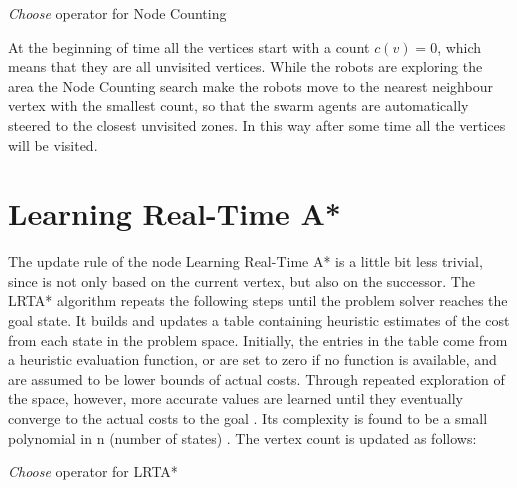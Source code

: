 \begin{algorithm}
\begin{algorithmic}[1]
 \label{a:find_next_nc}
\label{eq:nc_rule}
\end{algorithmic}
\caption{\emph{Choose} operator for Node Counting}\label{alg:rt_nc}
\end{algorithm}


At the beginning of time all the vertices start with a count $c(v)=0$, which means that they are all unvisited vertices. While the robots are exploring the area the Node Counting search make the robots move to the nearest neighbour vertex with the smallest count, so that the swarm agents are automatically steered to the closest unvisited zones. In this way after some time all the vertices will be visited.

\section{Learning Real-Time A*}
\label{sec:LRTAstar}

The update rule of the node Learning Real-Time A* is a little bit less trivial, since is not only based on the current vertex, but also on the successor. The LRTA* algorithm repeats the following steps until the problem solver reaches the goal state. It builds and updates a table containing heuristic estimates of the cost from each state in the problem space. Initially, the entries in the table come from a heuristic evaluation function, or are set to zero if no function is available, and are assumed to be lower bounds of actual costs. Through repeated exploration of the space, however, more accurate values are learned until they eventually converge to the actual costs to the goal \cite{Ishida:1998:RSA:608597.608621}. Its complexity is found to be a small polynomial in n (number of states) \cite{Koenig96easyand}. The vertex count is updated as follows:

\begin{algorithm}
\begin{algorithmic}[1]
 \label{a:find_next_lrta}
\label{eq:lrta_rule}
\end{algorithmic}
\caption{\emph{Choose} operator for LRTA*}\label{alg:rt_lrta}
\end{algorithm}

